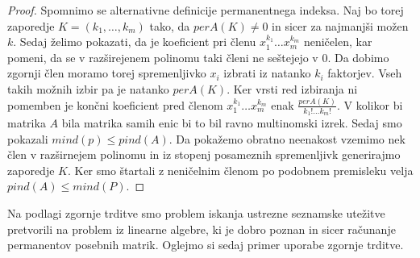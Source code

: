 \documentclass[12pt,a4paper,twoside]{article}
\theoremstyle{definition} %
\theoremstyle{plain} %
\numberwithin{equation}{section}  %
\begin{document}
\begin{proof}
Spomnimo se alternativne definicije permanentnega indeksa. Naj bo torej zaporedje $K = (k_1, \ldots, k_m)$ tako, da $per A(K) \neq 0$ in sicer za najmanjši možen $k$. Sedaj želimo pokazati, da je koeficient pri členu $x_1^{k_1}\ldots x_m^{k_m}$ neničelen, kar pomeni, da se v razširejenem polinomu taki členi ne seštejejo v $0$. Da dobimo zgornji člen moramo torej spremenljivko $x_i$ izbrati iz natanko $k_i$ faktorjev. Vseh takih možnih izbir pa je natanko $per A(K)$. Ker vrsti red izbiranja ni pomemben je končni koeficient pred členom  $x_1^{k_1}\ldots x_m^{k_m}$ enak $\frac{perA(K)}{k_1!\ldots k_m!}$. V kolikor bi matrika $A$ bila matrika samih enic bi to bil ravno multinomski izrek. Sedaj smo pokazali $mind(p) \le pind(A)$. Da pokažemo obratno neenakost vzemimo nek člen v razširnejem polinomu in iz stopenj posameznih spremenljivk generirajmo zaporedje $K$. Ker smo štartali z neničelnim členom po podobnem premisleku velja $pind(A) \le mind(P)$.
\end{proof}
Na podlagi zgornje trditve smo problem iskanja ustrezne seznamske utežitve pretvorili na problem iz linearne algebre, ki je dobro poznan in sicer računanje permanentov posebnih matrik. Oglejmo si sedaj primer uporabe zgornje trditve.
\end{document}
